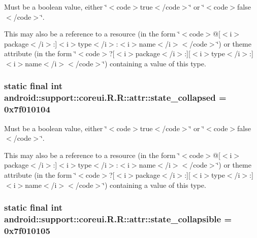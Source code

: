 Must be a boolean value, either \char`\"{}$<$code$>$true$<$/code$>$\char`\"{} or \char`\"{}$<$code$>$false$<$/code$>$\char`\"{}. 

This may also be a reference to a resource (in the form \char`\"{}$<$code$>$@\mbox{[}$<$i$>$package$<$/i$>$:\mbox{]}$<$i$>$type$<$/i$>$:$<$i$>$name$<$/i$>$$<$/code$>$\char`\"{}) or theme attribute (in the form \char`\"{}$<$code$>$?\mbox{[}$<$i$>$package$<$/i$>$:\mbox{]}\mbox{[}$<$i$>$type$<$/i$>$:\mbox{]}$<$i$>$name$<$/i$>$$<$/code$>$\char`\"{}) containing a value of this type. \hypertarget{classandroid_1_1support_1_1coreui_1_1_r_1_1attr_fb64bd819a9eddc25933b2f3502be98f}{
\subsubsection[{state\_\-collapsed}]{\setlength{\rightskip}{0pt plus 5cm}static final int android::support::coreui.R.R::attr::state\_\-collapsed = 0x7f010104}}
\label{classandroid_1_1support_1_1coreui_1_1_r_1_1attr_fb64bd819a9eddc25933b2f3502be98f}


Must be a boolean value, either \char`\"{}$<$code$>$true$<$/code$>$\char`\"{} or \char`\"{}$<$code$>$false$<$/code$>$\char`\"{}. 

This may also be a reference to a resource (in the form \char`\"{}$<$code$>$@\mbox{[}$<$i$>$package$<$/i$>$:\mbox{]}$<$i$>$type$<$/i$>$:$<$i$>$name$<$/i$>$$<$/code$>$\char`\"{}) or theme attribute (in the form \char`\"{}$<$code$>$?\mbox{[}$<$i$>$package$<$/i$>$:\mbox{]}\mbox{[}$<$i$>$type$<$/i$>$:\mbox{]}$<$i$>$name$<$/i$>$$<$/code$>$\char`\"{}) containing a value of this type. \hypertarget{classandroid_1_1support_1_1coreui_1_1_r_1_1attr_e6fe5d371cd0228b9ac44fa6e16d4a95}{
\subsubsection[{state\_\-collapsible}]{\setlength{\rightskip}{0pt plus 5cm}static final int android::support::coreui.R.R::attr::state\_\-collapsible = 0x7f010105}}
\label{classandroid_1_1support_1_1coreui_1_1_r_1_1attr_e6fe5d371cd0228b9ac44fa6e16d4a95}



